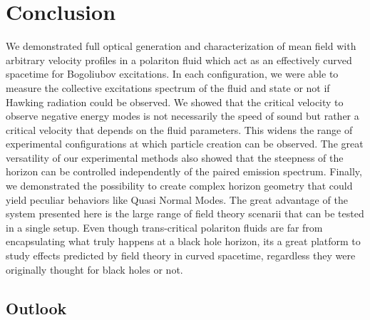 \section{Conclusion}

We demonstrated full optical generation and characterization of mean field with arbitrary velocity profiles in a polariton fluid which act as an effectively curved spacetime for 
Bogoliubov excitations. In each
configuration, we were able to measure the collective excitations spectrum of the fluid and state or not if Hawking radiation could be observed. We showed that the critical velocity to observe negative energy modes is not necessarily the speed of sound but rather a critical velocity 
that depends on the fluid parameters. This widens the range of experimental configurations at which particle creation can be observed. The great versatility of our experimental methods also showed that the steepness of the horizon can be controlled independently of the paired emission spectrum.
Finally, we demonstrated the possibility to create complex horizon geometry that could yield peculiar behaviors like Quasi Normal Modes. The great 
advantage of the system presented here is the large range of field theory scenarii that can be tested in a single setup. Even though
 trans-critical polariton fluids are far from encapsulating what truly happens at a black hole horizon, its a great platform to study effects predicted by field theory in curved spacetime, regardless they were
originally thought for black holes or not.

\subsection{Outlook}
